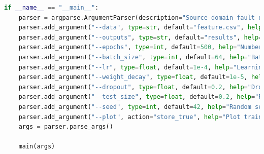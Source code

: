 \documentclass[a4paper]{CPIPC}
\numberwithin{equation}{section}
\begin{document}
\begin{lstlisting}[language=Python, caption=MLP Classifier]
if __name__ == "__main__":
    parser = argparse.ArgumentParser(description="Source domain fault diagnosis with MLP")
    parser.add_argument("--data", type=str, default="feature.csv", help="Path to input CSV data")
    parser.add_argument("--outputs", type=str, default="results", help="Directory to save model and results")
    parser.add_argument("--epochs", type=int, default=500, help="Number of training epochs")
    parser.add_argument("--batch_size", type=int, default=64, help="Batch size")
    parser.add_argument("--lr", type=float, default=1e-4, help="Learning rate")
    parser.add_argument("--weight_decay", type=float, default=1e-5, help="Weight decay")
    parser.add_argument("--dropout", type=float, default=0.2, help="Dropout rate")
    parser.add_argument("--test_size", type=float, default=0.2, help="Proportion of test set")
    parser.add_argument("--seed", type=int, default=42, help="Random seed")
    parser.add_argument("--plot", action="store_true", help="Plot training curves")
    args = parser.parse_args()

    main(args)
\end{lstlisting}
\end{document}
